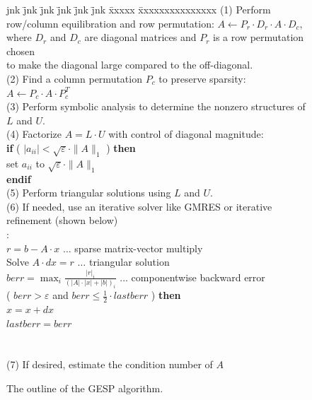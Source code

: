 \begin{figure}[htbp]
\begin{tabbing}
jnk \= jnk \= jnk \= jnk \= jnk \= jnk \= xxxxx \= xxxxxxxxxxxxxxx \kill
\>(1) Perform row/column equilibration and row permutation:
	$A \leftarrow P_r\cdot D_r\cdot A\cdot D_c$, \\
\> \>	where $D_r$ and $D_c$ are diagonal matrices and $P_r$ is a row 
        permutation chosen \\
\> \>	to make the diagonal large compared to the off-diagonal.\\
\>(2) Find a column permutation $P_c$ to preserve sparsity:
	$A\leftarrow P_c\cdot A\cdot P_c^T$ \\
\>(3) Perform symbolic analysis to determine the nonzero structures of $L$ and $U$.\\
\>(4) Factorize $A=L\cdot U$ with control of diagonal magnitude: \\
\>\>\> {\bf if} ( $|a_{ii}| < \sqrt{\varepsilon}\cdot \|A\|_1$ ) {\bf then} \\
\>\>\>\> set $a_{ii}$ to $\sqrt{\varepsilon}\cdot \|A\|_1$\\
\>\>\> {\bf endif} \\
\>(5) Perform triangular solutions using $L$ and $U$.\\
\>(6) If needed, use an iterative solver like GMRES or iterative refinement (shown below) \\
\>\>:\\
\>\>\>\>$r = b - A\cdot x$  \hspace{0.98in} $\ldots$ sparse matrix-vector 
multiply \\
\>\>\>\>Solve $A\cdot dx = r$     \hspace{.77in} $\ldots$ triangular solution\\
\>\>\>\>$berr = \max_i\frac{|r|_i}{(|A|\cdot|x|+|b|)_i}$
                    \hspace{.3in} $\ldots$ componentwise backward error \\
\>\>\> ( $berr > \varepsilon$ and 
		   $berr \le \frac{1}{2}\cdot lastberr$ )
	{\bf then} \\
\>\>\>\>\> $x = x + dx$   \\
\>\>\>\>\> $lastberr = berr$\\
\>\>\>\> \\
\>\>\> \\
\>(7) If desired, estimate the condition number of $A$
\end{tabbing}
\caption{The outline of the GESP algorithm.}
\label{fig:GESP_alg}
\end{figure}

